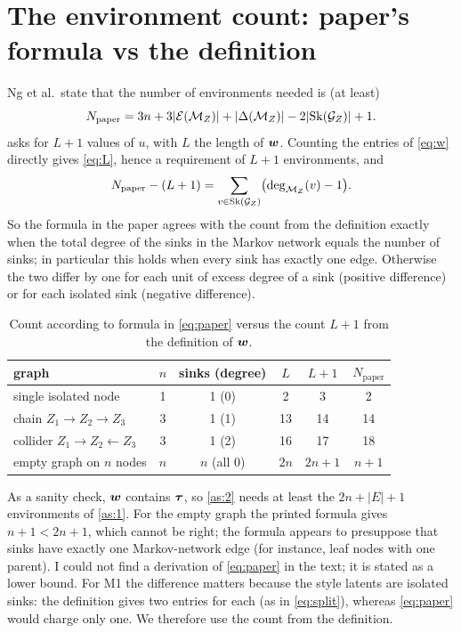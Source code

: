 \section{The environment count: paper's formula vs the definition}
\label{sec:count}

Ng et al.\ state that the number of environments needed is (at least) 
\cite[subsection ``Number of environments'']{ng2025}
\begin{equation}
N_{\mathrm{paper}}=3n+3|\mathcal{E}(\mathcal{M}_Z)|+|\Delta(\mathcal{M}_Z)|-2|\mathrm{Sk}(\mathcal{G}_Z)|+1 .
\label{eq:paper}
\end{equation}
 asks for $L+1$ values of $u$, with $L$ the length of $\boldsymbol{w}$. Counting the entries of
\cref{eq:w} directly gives \cref{eq:L}, hence a requirement of $L+1$ environments, and
\begin{equation}
N_{\mathrm{paper}}-(L+1)=\sum_{v\in\mathrm{Sk}(\mathcal{G}_Z)}\bigl(\deg_{\mathcal{M}_Z}(v)-1\bigr).
\label{eq:diff}
\end{equation}
So the formula in the paper agrees with the count from the definition exactly when the total degree of the
sinks in the Markov network equals the number of sinks; in particular this holds when every sink has
exactly one edge. Otherwise the two differ by one for each unit of excess degree of a sink (positive
difference) or for each isolated sink (negative difference).

\begin{table}[ht]
\centering
\caption{Count according to formula in \cref{eq:paper} versus the count $L+1$ from the definition of $\boldsymbol{w}$.}
\label{tab:paper}
\begin{tabular}{@{}lccccc@{}}
\toprule
graph & $n$ & sinks (degree) & $L$ & $L+1$ & $N_{\mathrm{paper}}$\\
\midrule
single isolated node                 & 1 & 1 (0) & 2  & 3  & 2 \\
chain $Z_1\to Z_2\to Z_3$             & 3 & 1 (1) & 13 & 14 & 14\\
collider $Z_1\to Z_2\leftarrow Z_3$   & 3 & 1 (2) & 16 & 17 & 18\\
empty graph on $n$ nodes              & $n$ & $n$ (all 0) & $2n$ & $2n+1$ & $n+1$\\
\bottomrule
\end{tabular}
\end{table}

As a sanity check, $\boldsymbol{w}$ contains $\boldsymbol{\tau}$, so \cref{as:2} needs at least the
$2n+|E|+1$ environments of \cref{as:1}. For the empty graph the printed formula gives $n+1<2n+1$,
which cannot be right; the formula appears to presuppose that sinks have exactly one Markov-network
edge (for instance, leaf nodes with one parent). I could not find a derivation of \cref{eq:paper} in
the text; it is stated as a lower bound. For M1 the difference matters because the style latents are
isolated sinks: the definition gives two entries for each (as in \cref{eq:split}), whereas
\cref{eq:paper} would charge only one. We therefore use the count from the definition.

